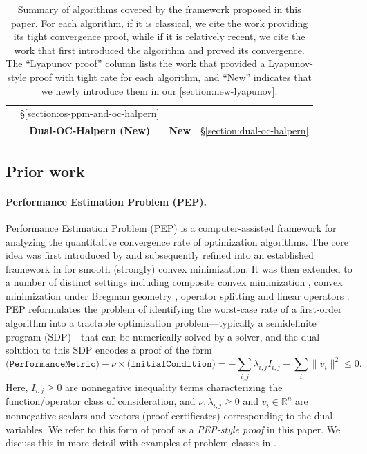 \documentclass{article}
\theoremstyle{definition}
\theoremstyle{plain}
\newcommand{\fullpep}{PEP-style proof}
\begin{document}
\begin{table}[H]
\begin{tabular}{cccc}
& \S\ref{section:os-ppm-and-oc-halpern} \\
& \textbf{Dual-OC-Halpern (New)}
& \textbf{New}
& \S\ref{section:dual-oc-halpern} \\
\hline
\end{tabular}
\caption{Summary of algorithms covered by the framework proposed in this paper.
For each algorithm, if it is classical, we cite the work providing its tight convergence proof, while if it is relatively recent, we cite the work that first introduced the algorithm and proved its convergence.
The ``Lyapunov proof'' column lists the work that provided a Lyapunov-style proof with tight rate for each algorithm, and ``New'' indicates that we newly introduce them in our \cref{section:new-lyapunov}. 
}
\label{table:contribution-summary}
\end{table}


\subsection{Prior work}

\paragraph{Performance Estimation Problem (PEP).} 



Performance Estimation Problem (PEP) is a computer-assisted framework for analyzing the quantitative convergence rate of optimization algorithms. The core idea was first introduced by \cite{DroriTeboulle2014_performance} and subsequently refined into an established framework in \cite{TaylorHendrickxGlineur2017_smooth} for smooth (strongly) convex minimization. 
It was then extended to a number of distinct settings including composite convex minimization \cite{TaylorHendrickxGlineur2018_exact}, convex minimization under Bregman geometry \cite{dragomirOptimalComplexityCertification2022}, operator splitting \cite{RyuTaylorBergelingGiselsson2020_operator} and linear operators \cite{BousselmiHendrickxGlineur2024_interpolation}.
PEP reformulates the problem of identifying the worst-case rate of a first-order algorithm into a tractable optimization problem—typically a semidefinite program (SDP)—that can be numerically solved by a solver, and the dual solution to this SDP encodes a proof of the form
\begin{equation}    \label{eq:proof_template} \tag{\fullpep}
    \texttt{(PerformanceMetric)} - \nu \times \texttt{(InitialCondition)}
= - \sum_{i,j} \lambda_{i,j} I_{i,j} - \sum_{i} \| v_i \|^2
\le 0 .
\end{equation}
Here, $I_{i,j} \ge 0$ are nonnegative inequality terms characterizing the function/operator class of consideration, and $\nu, \lambda_{i,j} \ge 0$ and $v_i \in \mathbb{R}^n$ are nonnegative scalars and vectors (proof certificates) corresponding to the dual variables. 
We refer to this form of proof as a \textit{\fullpep} in this paper. 
We discuss this in more detail with examples of problem classes in .
\end{document}
